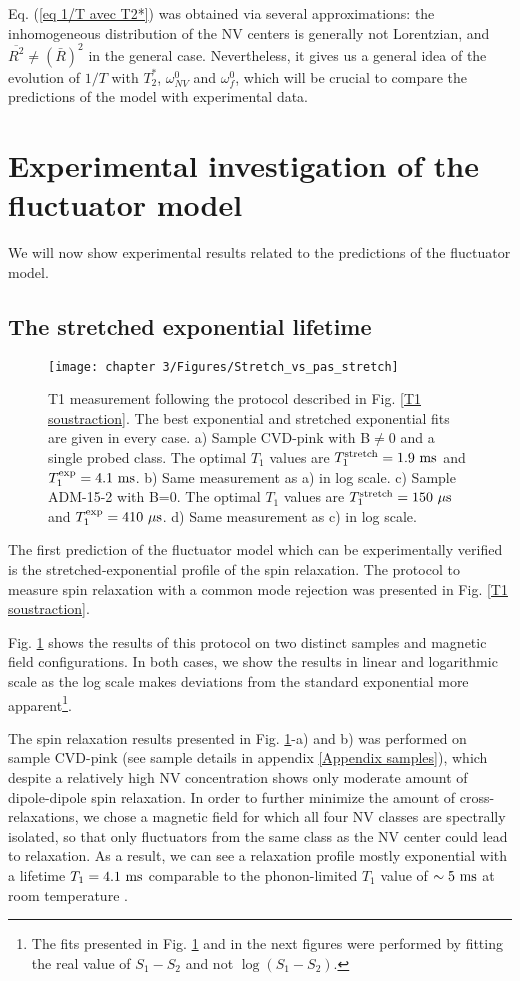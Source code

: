 \documentclass[a4paper, 11pt]{report}
\begin{document}
Eq. (\ref{eq 1/T avec T2*}) was obtained via several approximations: the inhomogeneous distribution of the NV centers is generally not Lorentzian, and $\overline{R^2} \neq (\bar{R})^2$ in the general case. Nevertheless, it gives us a general idea of the evolution of $1/T$ with $T_2^*$, $\omega_{NV}^0$ and $\omega_{f}^0$, which will be crucial to compare the predictions of the model with experimental data.


\section{Experimental investigation of the fluctuator model}
We will now show experimental results related to the predictions of the fluctuator model.
\subsection{The stretched exponential lifetime}
\begin{figure}[h]
\centering
\texttt{[image: chapter 3/Figures/Stretch\_vs\_pas\_stretch]}
\caption{T1 measurement following the protocol described in Fig. \ref{T1 soustraction}. The best exponential and stretched exponential fits are given in every case. a) Sample CVD-pink with B$\neq$0 and a single probed class. The optimal $T_1$ values are $T_1^{\rm stretch}=1.9\ \rm ms$ and $T_1^{\rm exp}=4.1\ \rm ms$. b) Same measurement as a) in log scale. c) Sample ADM-15-2 with B=0. The optimal $T_1$ values are $T_1^{\rm stretch}=150\ \mu \rm s$ and $T_1^{\rm exp}=410\ \mu \rm s$. d) Same measurement as c) in log scale.}
\label{stretch_or_not_stretch}
\end{figure}

The first prediction of the fluctuator model which can be experimentally verified is the stretched-exponential profile of the spin relaxation. The protocol to measure spin relaxation with a common mode rejection was presented in Fig. \ref{T1 soustraction}. 

Fig. \ref{stretch_or_not_stretch} shows the results of this protocol on two distinct samples and magnetic field configurations. In both cases, we show the results in linear and logarithmic scale as the log scale makes deviations from the standard exponential more apparent\footnote{The fits presented in Fig. \ref{stretch_or_not_stretch} and in the next figures were performed by fitting the real value of $S_1-S_2$ and not $\log(S_1-S_2)$.}.

The spin relaxation results presented in Fig. \ref{stretch_or_not_stretch}-a) and b) was performed on sample CVD-pink (see sample details in appendix \ref{Appendix samples}), which despite a relatively high NV concentration shows only moderate amount of dipole-dipole spin relaxation. In order to further minimize the amount of cross-relaxations, we chose a magnetic field for which all four NV classes are spectrally isolated, so that only fluctuators from the same class as the NV center could lead to relaxation. As a result, we can see a relaxation profile mostly exponential with a lifetime $T_1=4.1\ \rm ms$ comparable to the phonon-limited $T_1$ value of $\sim 5\ \rm ms$ at room temperature \citep{jarmola2012temperature}.
\end{document}
